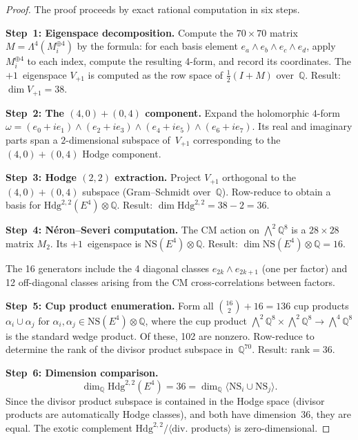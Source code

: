 \documentclass[11pt]{article}
\theoremstyle{plain}
\theoremstyle{definition}
\theoremstyle{remark}
\newcommand{\Q}{\mathbb{Q}}
\newcommand{\NS}{\mathrm{NS}}
\newcommand{\Hdg}{\mathrm{Hdg}}
\begin{document}
\begin{proof}
The proof proceeds by exact rational computation in six steps.

\smallskip\noindent
\textbf{Step~1: Eigenspace decomposition.}
Compute the $70 \times 70$ matrix $M = \Lambda^4(M_i^{\oplus 4})$
by the formula: for each basis element
$e_a \wedge e_b \wedge e_c \wedge e_d$, apply $M_i^{\oplus 4}$
to each index, compute the resulting 4-form, and record its
coordinates.  The $+1$~eigenspace $V_{+1}$ is computed as the
row space of $\tfrac{1}{2}(I + M)$ over~$\Q$.  Result:
$\dim V_{+1} = 38$.

\smallskip\noindent
\textbf{Step~2: The $(4,0)+(0,4)$ component.}
Expand the holomorphic $4$-form
$\omega = (e_0 + ie_1) \wedge (e_2 + ie_3)
  \wedge (e_4 + ie_5) \wedge (e_6 + ie_7)$.
Its real and imaginary parts span a $2$-dimensional subspace
of~$V_{+1}$ corresponding to the $(4,0) + (0,4)$ Hodge
component.

\smallskip\noindent
\textbf{Step~3: Hodge $(2,2)$ extraction.}
Project $V_{+1}$ orthogonal to the $(4,0)+(0,4)$ subspace
(Gram--Schmidt over~$\Q$).  Row-reduce to obtain a basis for
$\Hdg^{2,2}(E^4) \otimes \Q$.  Result:
$\dim \Hdg^{2,2} = 38 - 2 = 36$.

\smallskip\noindent
\textbf{Step~4: N\'eron--Severi computation.}
The CM action on $\bigwedge^2 \Q^8$ is a $28 \times 28$ matrix
$M_2$.  Its $+1$~eigenspace is $\NS(E^4) \otimes \Q$.  Result:
$\dim \NS(E^4) \otimes \Q = 16$.

The 16 generators include the 4 diagonal classes $e_{2k} \wedge
e_{2k+1}$ (one per factor) and 12 off-diagonal classes
arising from the CM cross-correlations between factors.

\smallskip\noindent
\textbf{Step~5: Cup product enumeration.}
Form all $\binom{16}{2} + 16 = 136$ cup products
$\alpha_i \cup \alpha_j$ for $\alpha_i, \alpha_j \in
\NS(E^4) \otimes \Q$, where the cup product
$\bigwedge^2 \Q^8 \times \bigwedge^2 \Q^8 \to \bigwedge^4 \Q^8$
is the standard wedge product.  Of these, 102 are nonzero.
Row-reduce to determine the rank of the divisor product subspace
in~$\Q^{70}$.  Result: $\mathrm{rank} = 36$.

\smallskip\noindent
\textbf{Step~6: Dimension comparison.}
\[
  \dim_\Q \Hdg^{2,2}(E^4) = 36 = \dim_\Q
  \langle \NS_i \cup \NS_j \rangle.
\]
Since the divisor product subspace is contained in the Hodge space
(divisor products are automatically Hodge classes), and both have
dimension~36, they are equal.  The exotic complement
$\Hdg^{2,2} / \langle \text{div.\ products} \rangle$ is
zero-dimensional.
\end{proof}
\end{document}
